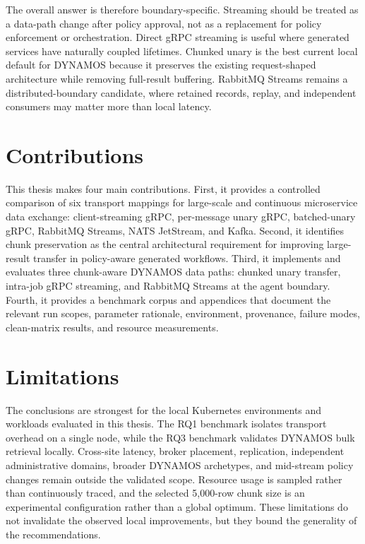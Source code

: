 The overall answer is therefore boundary-specific. Streaming should be treated as a data-path change after policy approval, not as a replacement for policy enforcement or orchestration. Direct gRPC streaming is useful where generated services have naturally coupled lifetimes. Chunked unary is the best current local default for DYNAMOS because it preserves the existing request-shaped architecture while removing full-result buffering. RabbitMQ Streams remains a distributed-boundary candidate, where retained records, replay, and independent consumers may matter more than local latency.

\section{Contributions}

This thesis makes four main contributions. First, it provides a controlled comparison of six transport mappings for large-scale and continuous microservice data exchange: client-streaming gRPC, per-message unary gRPC, batched-unary gRPC, RabbitMQ Streams, NATS JetStream, and Kafka. Second, it identifies chunk preservation as the central architectural requirement for improving large-result transfer in policy-aware generated workflows. Third, it implements and evaluates three chunk-aware DYNAMOS data paths: chunked unary transfer, intra-job gRPC streaming, and RabbitMQ Streams at the agent boundary. Fourth, it provides a benchmark corpus and appendices that document the relevant run scopes, parameter rationale, environment, provenance, failure modes, clean-matrix results, and resource measurements.

\section{Limitations}

The conclusions are strongest for the local Kubernetes environments and workloads evaluated in this thesis. The RQ1 benchmark isolates transport overhead on a single node, while the RQ3 benchmark validates DYNAMOS bulk retrieval locally. Cross-site latency, broker placement, replication, independent administrative domains, broader DYNAMOS archetypes, and mid-stream policy changes remain outside the validated scope. Resource usage is sampled rather than continuously traced, and the selected 5{,}000-row chunk size is an experimental configuration rather than a global optimum. These limitations do not invalidate the observed local improvements, but they bound the generality of the recommendations.

